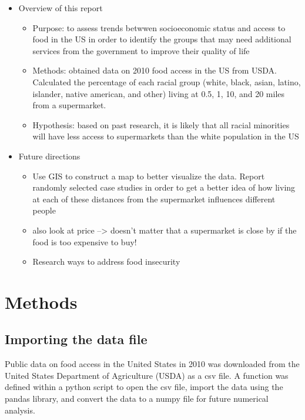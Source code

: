 \documentclass[letterpaper]{article} %
\begin{document}
\begin{itemize}
\begin{itemize}
		\end{itemize}
	\item Overview of this report
		\begin{itemize}\itemsep -.1cm\vspace{-.25cm}
			\item Purpose: to assess trends betwwen socioeconomic status and access to food in the US in order to identify the groups that may need additional services from the government to improve their quality of life
			\item Methods: obtained data on 2010 food access in the US from USDA. Calculated the percentage of each racial group (white, black, asian, latino, islander, native american, and other) living at 0.5, 1, 10, and 20 miles from a supermarket.
			\item Hypothesis: based on past research, it is likely that all racial minorities will have less access to supermarkets than the white population in the US
		\end{itemize}
	\item Future directions
		\begin{itemize}\itemsep -.1cm\vspace{-.25cm}
			\item Use GIS to construct a map to better visualize the data. Report randomly selected case studies in order to get a better idea of how living at each of these distances from the supermarket influences different people
			\item also look at price --> doesn't matter that a supermarket is close by if the food is too expensive to buy!
			\item Research ways to address food insecurity
		\end{itemize}
\end{itemize}

\section{Methods}

\subsection{Importing the data file} 

Public data on food access in the United States in 2010 was downloaded from the United States Department of Agriculture (USDA) as a csv file.  A function was defined within a python script to open the csv file, import the data using the pandas library, and convert the data to a numpy file for future numerical analysis.
\vspace{0.25cm}
\end{document}
